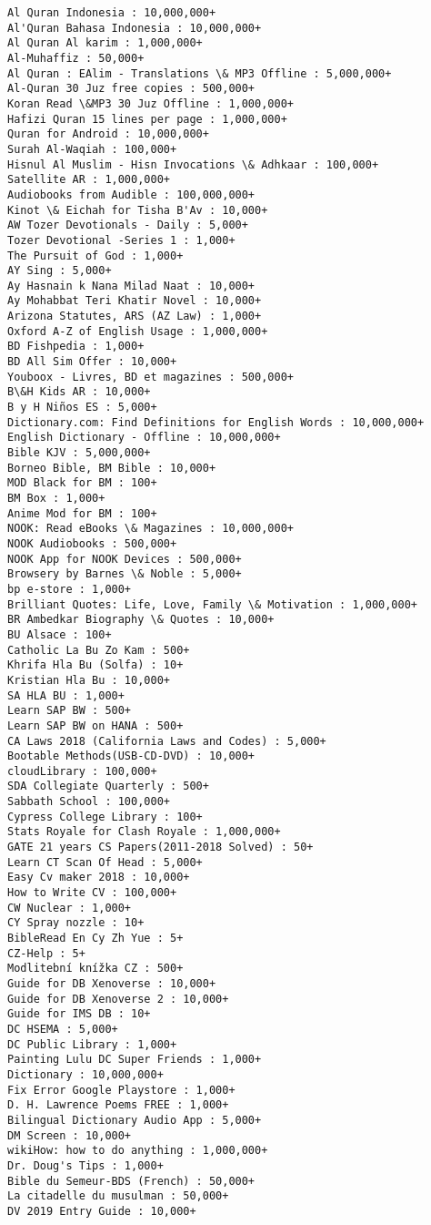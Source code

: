 \documentclass[11pt]{article}
\begin{document}
\begin{Verbatim}[commandchars=\\\{\}]
Al Quran Indonesia : 10,000,000+
Al'Quran Bahasa Indonesia : 10,000,000+
Al Quran Al karim : 1,000,000+
Al-Muhaffiz : 50,000+
Al Quran : EAlim - Translations \& MP3 Offline : 5,000,000+
Al-Quran 30 Juz free copies : 500,000+
Koran Read \&MP3 30 Juz Offline : 1,000,000+
Hafizi Quran 15 lines per page : 1,000,000+
Quran for Android : 10,000,000+
Surah Al-Waqiah : 100,000+
Hisnul Al Muslim - Hisn Invocations \& Adhkaar : 100,000+
Satellite AR : 1,000,000+
Audiobooks from Audible : 100,000,000+
Kinot \& Eichah for Tisha B'Av : 10,000+
AW Tozer Devotionals - Daily : 5,000+
Tozer Devotional -Series 1 : 1,000+
The Pursuit of God : 1,000+
AY Sing : 5,000+
Ay Hasnain k Nana Milad Naat : 10,000+
Ay Mohabbat Teri Khatir Novel : 10,000+
Arizona Statutes, ARS (AZ Law) : 1,000+
Oxford A-Z of English Usage : 1,000,000+
BD Fishpedia : 1,000+
BD All Sim Offer : 10,000+
Youboox - Livres, BD et magazines : 500,000+
B\&H Kids AR : 10,000+
B y H Niños ES : 5,000+
Dictionary.com: Find Definitions for English Words : 10,000,000+
English Dictionary - Offline : 10,000,000+
Bible KJV : 5,000,000+
Borneo Bible, BM Bible : 10,000+
MOD Black for BM : 100+
BM Box : 1,000+
Anime Mod for BM : 100+
NOOK: Read eBooks \& Magazines : 10,000,000+
NOOK Audiobooks : 500,000+
NOOK App for NOOK Devices : 500,000+
Browsery by Barnes \& Noble : 5,000+
bp e-store : 1,000+
Brilliant Quotes: Life, Love, Family \& Motivation : 1,000,000+
BR Ambedkar Biography \& Quotes : 10,000+
BU Alsace : 100+
Catholic La Bu Zo Kam : 500+
Khrifa Hla Bu (Solfa) : 10+
Kristian Hla Bu : 10,000+
SA HLA BU : 1,000+
Learn SAP BW : 500+
Learn SAP BW on HANA : 500+
CA Laws 2018 (California Laws and Codes) : 5,000+
Bootable Methods(USB-CD-DVD) : 10,000+
cloudLibrary : 100,000+
SDA Collegiate Quarterly : 500+
Sabbath School : 100,000+
Cypress College Library : 100+
Stats Royale for Clash Royale : 1,000,000+
GATE 21 years CS Papers(2011-2018 Solved) : 50+
Learn CT Scan Of Head : 5,000+
Easy Cv maker 2018 : 10,000+
How to Write CV : 100,000+
CW Nuclear : 1,000+
CY Spray nozzle : 10+
BibleRead En Cy Zh Yue : 5+
CZ-Help : 5+
Modlitební knížka CZ : 500+
Guide for DB Xenoverse : 10,000+
Guide for DB Xenoverse 2 : 10,000+
Guide for IMS DB : 10+
DC HSEMA : 5,000+
DC Public Library : 1,000+
Painting Lulu DC Super Friends : 1,000+
Dictionary : 10,000,000+
Fix Error Google Playstore : 1,000+
D. H. Lawrence Poems FREE : 1,000+
Bilingual Dictionary Audio App : 5,000+
DM Screen : 10,000+
wikiHow: how to do anything : 1,000,000+
Dr. Doug's Tips : 1,000+
Bible du Semeur-BDS (French) : 50,000+
La citadelle du musulman : 50,000+
DV 2019 Entry Guide : 10,000+

\end{Verbatim}
\end{document}
